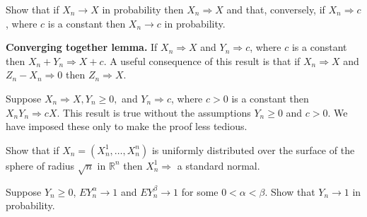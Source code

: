   \begin{exercise}[Durrett 3.2.12]
    Show that if $X_n \to X$ in probability then $X_n \Rightarrow X$ and that, conversely, if $X_n \Rightarrow c$, where $c$ is a constant then $X_n \to c$ in probability.
  \end{exercise}
  \begin{solution}

  \end{solution}

  \begin{exercise}[Durrett 3.2.13]
    \textbf{Converging together lemma.} If $X_n \Rightarrow X$ and $Y_n \Rightarrow c$, where $c$ is a constant then $X_n + Y_n \Rightarrow X + c$. A useful consequence of this result is that if $X_n \Rightarrow X$ and $Z_n - X_n \Rightarrow 0$ then $Z_n \Rightarrow X$.
  \end{exercise}
  \begin{solution}

  \end{solution}

  \begin{exercise}[Durrett 3.2.14]
    Suppose $X_n \Rightarrow X, Y_n \geq 0,$ and $Y_n \Rightarrow c$, where $c > 0$ is a constant then $X_n Y_n \Rightarrow cX$. This result is true without the assumptions $Y_n \geq 0$ and $c > 0$. We have imposed these only to make the proof less tedious.
  \end{exercise}
  \begin{solution}

  \end{solution}

  \begin{exercise}[Durrett 3.2.15]
    Show that if $X_n = (X_n^1, \dots, X_n^n)$ is uniformly distributed over the surface of the sphere of radius $\sqrt{n}$ in $\mathbb{R}^n$ then $X_n^1 \Rightarrow$ a standard normal.
  \end{exercise}
  \begin{solution}

  \end{solution}

  \begin{exercise}[Durrett 3.2.16]
    Suppose $Y_n \geq 0$, $E Y_n^\alpha \to 1$ and $E Y_n^\beta \to 1$ for some $0 < \alpha < \beta$. Show that $Y_n \to 1$ in probability.
  \end{exercise}
  \begin{solution}

  \end{solution}

